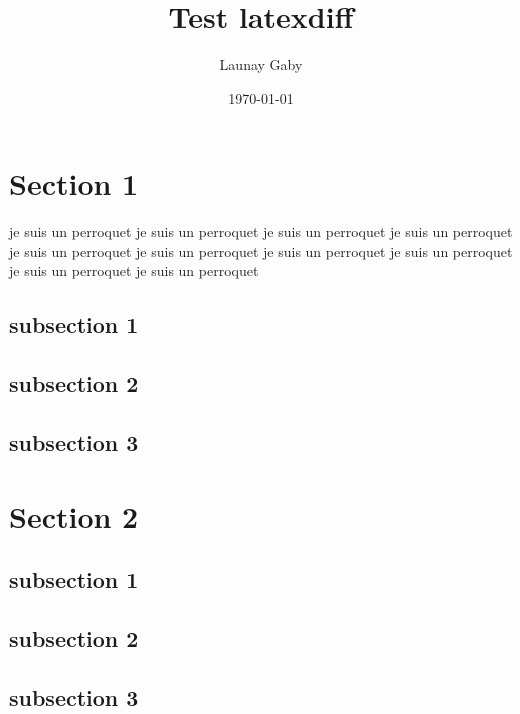 \documentclass[11pt, a4paper]{article}
\author{Launay Gaby}
\title{Test latexdiff}
\date{\today}
\begin{document}
\maketitle



\section{Section 1}
je suis un perroquet
je suis un perroquet
je suis un perroquet
je suis un perroquet
je suis un perroquet
je suis un perroquet
je suis un perroquet
je suis un perroquet
je suis un perroquet
je suis un perroquet
\subsection{subsection 1}
\subsection{subsection 2}
\subsection{subsection 3}

\section{Section 2}
\subsection{subsection 1}
\subsection{subsection 2}
\subsection{subsection 3}
\end{document}
